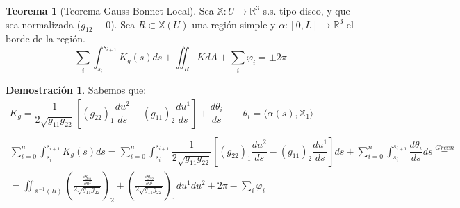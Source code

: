 \documentclass[twoside]{report}
\theoremstyle{definition}
\newtheorem{theorem}{Teorema}[section]
\newtheorem*{dem}{Demostración}
\numberwithin{equation}{section}
\newcommand{\R}{\mathbb{R}}
\newcommand{\X}{\mathbb{X}}
\newcommand{\seaX}{\X:U\rightarrow\R^3}
\begin{document}
\begin{theorem}[Teorema Gauss-Bonnet Local]
Sea $\seaX$ s.s. tipo disco, y que sea normalizada ($g_{12} \equiv 0$). Sea $R\subset \X(U)$ una región simple y $\alpha:[0,L]\rightarrow\R^3$ el borde de la región.
\[
\sum_i \int_{s_i}^{s_{i+1}} K_g(s)ds + \iint_{R} KdA +  \sum_i \varphi_i  = \pm 2\pi
\]
\end{theorem}
\begin{dem}
Sabemos que:
\begin{gather*}
K_g = \dfrac{1}{2\sqrt{g_{11}g_{22}}}\left[(g_{22})_1\dfrac{du^2}{ds}-(g_{11})_2 \dfrac{du^1}{ds}\right]+\dfrac{d\theta_i}{ds} \qquad \theta_i = \langle\dot{\alpha}(s),\X_1\rangle \\ \\
\sum_{i=0}^n  \int_{s_i}^{s_{i+1}} K_g(s) ds = \sum_{i=0}^n  \int_{s_i}^{s_{i+1}} \dfrac{1}{2\sqrt{g_{11}g_{22}}}\left[(g_{22})_1\dfrac{du^2}{ds}-(g_{11})_2 \dfrac{du^1}{ds}\right]ds + \sum_{i=0}^n  \int_{s_i}^{s_{i+1}} \dfrac{d\theta_i}{ds} ds \overset{Green}{=}\\
= \iint_{\X^{-1}(R)} \left(\frac{\frac{\partial g_{11}}{\partial u^2}}{2\sqrt{g_{11}g_{22}}}\right)_2 + \left( \frac{\frac{\partial g_{22}}{\partial u^1}}{2\sqrt{g_{11}g_{22}}} \right)_1  du^1du^2 + 2\pi - \sum_i \varphi_i 
\end{gather*}
\end{dem}
\end{document}
